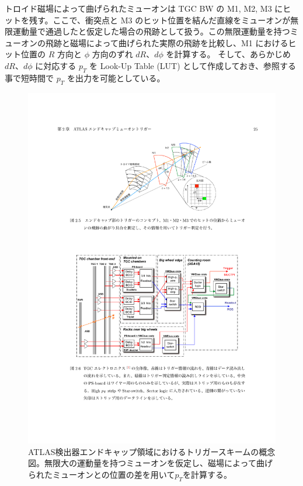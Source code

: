 トロイド磁場によって曲げられたミューオンは TGC BW の M1, M2, M3 にヒットを残す。ここで、衝突点と M3 のヒット位置を結んだ直線をミューオンが無限運動量で通過したと仮定した場合の飛跡として扱う。この無限運動量を持つミューオンの飛跡と磁場によって曲げられた実際の飛跡を比較し、M1 におけるヒット位置の $R$ 方向と $\phi$ 方向のずれ $dR$、$d\phi$ を計算する。
そして、あらかじめ $dR$、$d\phi$ に対応する $p_T$ を Look-Up Table (LUT) として作成しておき、参照する事で短時間で $p_T$ を出力を可能としている。

\begin{figure}[tb]
  \centering
  \includegraphics[clip, width=15cm]{fig/3/akatsuka_mt_trigger_scheme.pdf}
  \caption{ATLAS検出器エンドキャップ領域におけるトリガースキームの概念図\cite{article:akatsuka-mron}。無限大の運動量を持つミューオンを仮定し、磁場によって曲げられたミューオンとの位置の差を用いて$p_T$を計算する。}
  \label{fig:trigger-scheme}
\end{figure}

